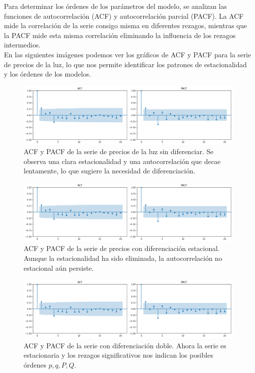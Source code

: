 Para determinar los órdenes de los parámetros del modelo, se analizan las funciones de autocorrelación (ACF) y autocorrelación parcial (PACF). La ACF mide la correlación de la serie consigo misma en diferentes rezagos, mientras que la PACF mide esta misma correlación eliminando la influencia de los rezagos intermedios.\\

En las siguientes imágenes podemos ver los gráficos de ACF y PACF para la serie de precios de la luz, lo que nos permite identificar los patrones de estacionalidad y los órdenes de los modelos.

\begin{figure}[H]
    \centering
    \includegraphics[width=0.7\linewidth]{figuras/ACF_PACF.png}
    \caption{ACF y PACF de la serie de precios de la luz sin diferenciar. Se observa una clara estacionalidad y una autocorrelación que decae lentamente, lo que sugiere la necesidad de diferenciación.}
    \label{fig:ACF_sin_diferenciar}
\end{figure}
\begin{figure}[H]
    \centering
    \includegraphics[width=0.7\linewidth]{figuras/ACF_PACF.png}
    \caption{ACF y PACF de la serie de precios con diferenciación estacional. Aunque la estacionalidad ha sido eliminada, la autocorrelación no estacional aún persiste.}
    \label{diferenciado}
\end{figure}
\begin{figure}[H]
    \centering
    \includegraphics[width=0.7\linewidth]{figuras/ACF_PACF.png}
    \caption{ACF y PACF de la serie con diferenciación doble. Ahora la serie es estacionaria y los rezagos significativos nos indican los posibles órdenes $p, q, P, Q$.}
    \label{dobledifereniado}
\end{figure}

